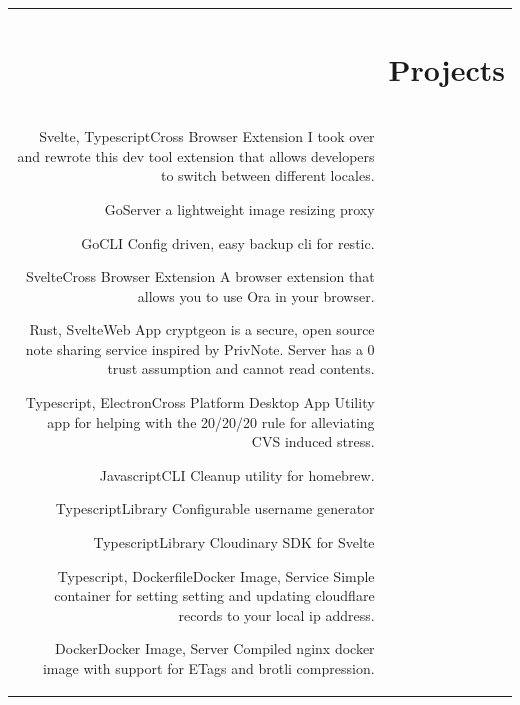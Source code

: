 \documentclass[letterpaper,10pt]{article}
\newcommand{\headingfont}{\Large\color{accent}\BluuNext}
\newenvironment{SectionTable}[1]{
	\renewcommand*{\arraystretch}{1.7}
	\setlength{\tabcolsep}{10pt}
	\begin{longtable}{Rp{5.2in}} & #1 \\}
{\end{longtable}\vspace{-.3cm}}
\begin{document}
\begin{SectionTable}{\headingfont \section{Projects}}

  {Svelte, Typescript}{Cross Browser Extension}
  {
    I took over and rewrote this dev tool extension that allows developers to switch between different locales.
  }

  {Go}{Server}
  {
    a lightweight image resizing proxy
  }

  {Go}{CLI}
  {
    Config driven, easy backup cli for restic.
  }

  {Svelte}{Cross Browser Extension}
  {
    A browser extension that allows you to use Ora in your browser.
  }

  {Rust, Svelte}{Web App}{
    cryptgeon is a secure, open source note sharing service inspired by PrivNote. Server has a 0 trust assumption and cannot read contents.
  }

  {Typescript, Electron}{Cross Platform Desktop App}{
    Utility app for helping with the 20/20/20 rule for alleviating CVS induced stress.
  }

  {Javascript}{CLI}{
    Cleanup utility for homebrew.
  }

  {Typescript}{Library}{
    Configurable username generator
  }

  {Typescript}{Library}{
    Cloudinary SDK for Svelte
  }

  {Typescript, Dockerfile}{Docker Image, Service}{
    Simple container for setting setting and updating cloudflare records to your local ip address.
  }

  {Docker}{Docker Image, Server}{
    Compiled nginx docker image with support for ETags and brotli compression.
  }


\end{SectionTable}
\end{document}
